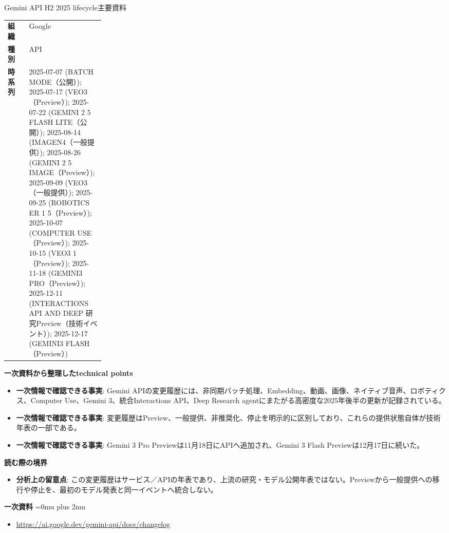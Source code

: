 \begin{technicalnote}{Gemini API H2 2025 lifecycle}{主要資料}
\begingroup
\begin{tabularx}{\linewidth}{@{}>{\bfseries}p{0.22\linewidth}X@{}}
組織 & Google \\
種別 & API \\
時系列 & 2025-07-07 (BATCH MODE（公開）); 2025-07-17 (VEO3（Preview）); 2025-07-22 (GEMINI 2 5 FLASH LITE（公開）); 2025-08-14 (IMAGEN4（一般提供）); 2025-08-26 (GEMINI 2 5 IMAGE（Preview）); 2025-09-09 (VEO3（一般提供）); 2025-09-25 (ROBOTICS ER 1 5（Preview）); 2025-10-07 (COMPUTER USE（Preview）); 2025-10-15 (VEO3 1（Preview）); 2025-11-18 (GEMINI3 PRO（Preview）); 2025-12-11 (INTERACTIONS API AND DEEP 研究Preview（技術イベント）); 2025-12-17 (GEMINI3 FLASH（Preview）) \\
\end{tabularx}
\smallskip
{\bfseries 一次資料から整理したtechnical points}
\begin{itemize}[leftmargin=1.5em,itemsep=0.35em]
\item \textbf{一次情報で確認できる事実}: Gemini APIの変更履歴には、非同期バッチ処理、Embedding、動画、画像、ネイティブ音声、ロボティクス、Computer Use、Gemini 3、統合Interactions API、Deep Research agentにまたがる高密度な2025年後半の更新が記録されている。
\item \textbf{一次情報で確認できる事実}: 変更履歴はPreview、一般提供、非推奨化、停止を明示的に区別しており、これらの提供状態自体が技術年表の一部である。
\item \textbf{一次情報で確認できる事実}: Gemini 3 Pro Previewは11月18日にAPIへ追加され、Gemini 3 Flash Previewは12月17日に続いた。
\end{itemize}
\begin{minipage}{\linewidth}
{\bfseries 読む際の境界}
\begin{itemize}[leftmargin=1.5em,itemsep=0.35em]
\item \textbf{分析上の留意点}: この変更履歴はサービス／APIの年表であり、上流の研究・モデル公開年表ではない。Previewから一般提供への移行や停止を、最初のモデル発表と同一イベントへ統合しない。
\end{itemize}
\begin{samepage}
{\bfseries 一次資料}
\begingroup\sloppy
\Urlmuskip=0mu plus 2mu\relax
\begin{itemize}[leftmargin=1.5em,itemsep=0.25em]
\item {\scriptsize\url{https://ai.google.dev/gemini-api/docs/changelog}}
\end{itemize}
\endgroup
\end{samepage}
\end{minipage}
\endgroup
\end{technicalnote}
\medskip

